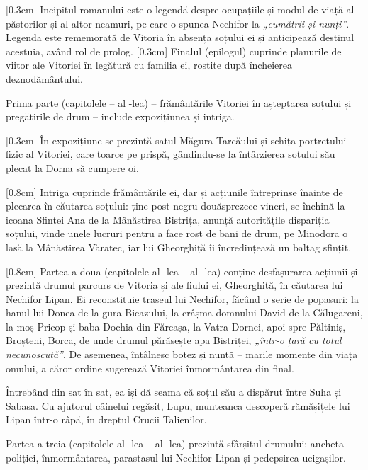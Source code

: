 [0.3cm]
Incipitul romanului este o legendă despre ocupațiile și modul de viață al păstorilor și al altor neamuri, pe care o spunea Nechifor la \textit{„cumătrii și nunți”}. Legenda este rememorată de Vitoria în absența soțului ei și anticipează destinul acestuia, având rol de prolog.
[0.3cm]
Finalul (epilogul) cuprinde planurile de viitor ale Vitoriei în legătură cu familia ei, rostite după încheierea deznodământului.

Prima parte (capitolele  -- al -lea) -- frământările Vitoriei în așteptarea soțului și pregătirile de drum -- include expozițiunea și intriga.

[0.3cm]
În expozițiune se prezintă satul Măgura Tarcăului și schița portretului fizic al Vitoriei, care toarce pe prispă, gândindu-se la întârzierea soțului său plecat la Dorna să cumpere oi.

[0.8cm]
Intriga cuprinde frământările ei, dar și acțiunile întreprinse înainte de plecarea în căutarea soțului: ține post negru douăsprezece vineri, se închină la icoana Sfintei Ana de la Mânăstirea Bistrița, anunță autoritățile dispariția soțului, vinde unele lucruri pentru a face rost de bani de drum, pe Minodora o lasă la Mânăstirea Văratec, iar lui Gheorghiță îi încredințează un baltag sfințit.

[0.8cm]
Partea a doua (capitolele al -lea -- al -lea) conține desfășurarea acțiunii și prezintă drumul parcurs de Vitoria și ale fiului ei, Gheorghiță, în căutarea lui Nechifor Lipan. Ei reconstituie traseul lui Nechifor, făcând o serie de popasuri: la hanul lui Donea de la gura Bicazului, la crâșma domnului David de la Călugăreni, la moș Pricop și baba Dochia din Fărcașa, la Vatra Dornei, apoi spre Păltiniș, Broșteni, Borca, de unde drumul părăsește apa Bistriței, \textit{„într-o țară cu totul necunoscută”}. De asemenea, întâlnesc botez și nuntă -- marile momente din viața omului, a căror ordine sugerează Vitoriei înmormântarea din final.

Întrebând din sat în sat, ea își dă seama că soțul său a dispărut între Suha și Sabasa. Cu ajutorul câinelui regăsit, Lupu, munteanca descoperă rămășițele lui Lipan într-o râpă, în dreptul Crucii Talienilor.

Partea a treia (capitolele al -lea -- al -lea) prezintă sfârșitul drumului: ancheta poliției, înmormântarea, parastasul lui Nechifor Lipan și pedepsirea ucigașilor.

